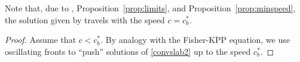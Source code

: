 \documentclass[11pt]{article}    %
\begin{document}
\noindent Note that, due to , Proposition~\ref{prop:limits}, and Proposition~\ref{prop:minspeed}, the solution given by  travels with the speed $c=c_b^*$.


\begin{proof}%

Assume that $c<c_b^*$.  By analogy with the Fisher-KPP equation, we use oscillating fronts to ``push'' solutions of \eqref{convslab2} up to the speed $c_b^*$. %

%
%
%
%
%
%
%
%
%
%
%




\end{proof}
\end{document}
